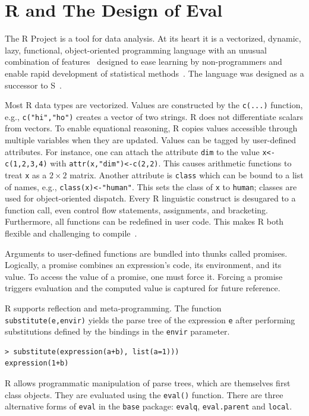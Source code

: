 \documentclass[a4paper,USenglish,cleveref, autoref, thm-restate]{lipics-v2019}
\newcommand{\eval}{\texttt{eval}\xspace}
\renewcommand{\c}[1]{\lstinline{#1}\xspace}
\begin{document}
\section{R and The Design of Eval}

The R Project is a tool for data analysis.  At its heart it is a {vectorized,
  dynamic, lazy, functional, object-oriented} programming language with an
unusual combination of features~\cite{ecoop12} designed to ease learning by
non-programmers and enable rapid development of statistical
methods~\cite{R96}.  The language was designed as a successor to
S~\cite{S88}.



Most R data types are vectorized. Values are constructed by the \c{c(...)}
function, e.g., \c{c("hi","ho")} creates a vector of two strings.  R does
not differentiate scalars from vectors. To enable equational reasoning, R
copies values accessible through multiple variables when they are updated.
Values can be tagged by user-defined attributes. For instance, one can
attach the attribute \c{dim} to the value \c{x<-c(1,2,3,4)} with
\c{attr(x,"dim")<-c(2,2)}.  This causes arithmetic functions to treat \c x
as a $2 \times 2$ matrix. Another attribute is \c{class} which can be bound to a list
of names, e.g., \c{class(x)<-"human"}. This sets the class of \c{x} to
\c{human}; classes are used for object-oriented dispatch.  Every R
linguistic construct is desugared to a function call, even control flow
statements, assignments, and bracketing. Furthermore, all functions can be
redefined in user code. This makes R both flexible and challenging to
compile~\cite{dls19}.

Arguments to user-defined functions are bundled into thunks called
promises. Logically, a promise combines an expression's code, its
environment, and its value.  To access the value of a promise, one must
force it. Forcing a promise triggers evaluation and the computed value is
captured for future reference.


R supports reflection and meta-programming. The function \c{substitute(e,envir)}
yields the parse tree of the expression \c{e} after performing substitutions
defined by the bindings in the \c{envir} parameter.

\begin{lstlisting}
> substitute(expression(a+b), list(a=1)))  
expression(1+b)
\end{lstlisting}

\noindent
R allows programmatic manipulation of parse trees, which are themselves
first class objects. They are evaluated using the \c{eval()}
function. There are three alternative forms  of \eval in the \c{base} package:
\c{evalq}, \c{eval.parent} and \c{local}.
\end{document}
